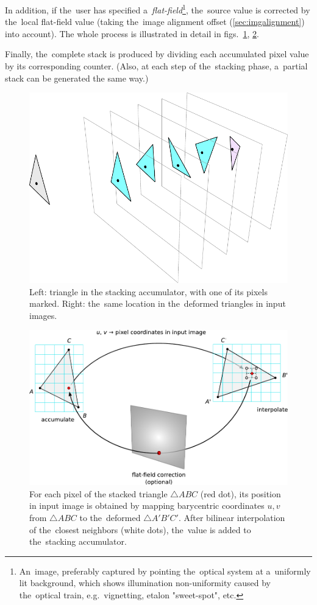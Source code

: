 \documentclass[12pt]{article}
\newcommand{\nbd}{\nobreakdash}
\begin{document}
In addition, if the~user has specified a~\emph{flat-field}\footnote{An~image, preferably captured by pointing
the~optical system at a~uniformly lit background, which shows illumination non\nbd-uniformity caused by the~optical
train, e.g.~vignetting, etalon "sweet\nbd-spot", etc.}, the~source value is corrected by the~local flat\nbd-field value
(taking the~image alignment offset (\ref{sec:imgalignment}) into account). The whole process is illustrated in detail in
figs.~\ref{fig:stacking1}, \ref{fig:stacking2}.

Finally, the~complete stack is produced by dividing each accumulated pixel value by its corresponding counter. (Also, at
each step of the~stacking phase, a~partial stack can be generated the same way.)

\begin{figure}
\centering
\includegraphics{stacking.pdf}
\caption{Left: triangle in the stacking accumulator, with one of its pixels marked. Right: the~same location in
the~deformed triangles in input images.}
\label{fig:stacking1}
\end{figure}

\begin{figure}
\centering
\includegraphics{stacking2.pdf}
\caption{For each pixel of the stacked triangle $\triangle ABC$ (red dot), its position in input image is obtained by
mapping barycentric coordinates $u, v$ from $\triangle ABC$ to the~deformed $\triangle A'B'C'$. After bilinear
interpolation of the~closest neighbors (white dots), the~value is added to the~stacking accumulator.}
\label{fig:stacking2}
\end{figure}
\end{document}
